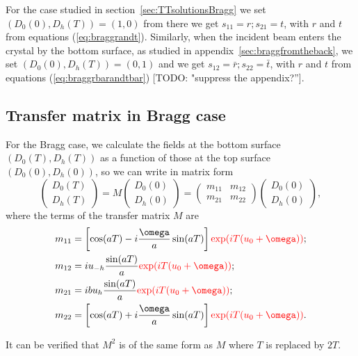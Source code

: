 \documentclass[preprint]{iucr}              %
\newcommand{\todo}[1]{{\color{red}[TODO: "#1'']}}
\newcommand{\inred}[1]{{\color{red}#1}}
\begin{document}
For the case studied in section~\ref{sec:TTsolutionsBragg} we set $(D_0(0),D_h(T))=(1,0)$ from there we get $s_{11}=r; s_{21}=t$, with $r$ and $t$ from equations (\ref{eq:braggrandt}). Similarly, when the incident beam enters the crystal by the bottom surface, as studied in appendix~\ref{sec:braggfromtheback}, we set $(D_0(0),D_h(T))=(0,1)$ and  we get $s_{12}=\bar{r}; s_{22}=\bar{t}$, with $r$ and $t$ from equations (\ref{eq:braggrbarandtbar}) \todo{suppress the appendix?}.


\subsection{Transfer matrix in Bragg case}
For the Bragg case, we calculate the fields at the bottom surface $(D_0(T),D_h(T))$ as a function of those at the top surface $(D_0(0),D_h(0))$, so we can write in matrix form
\begin{equation}
    \begin{pmatrix}
    D_0(T)\\
    D_h(T)
    \end{pmatrix}
    =
    M
        \begin{pmatrix}
    D_0(0) \\
    D_h(0)
    \end{pmatrix}
    =
    \begin{pmatrix}
    m_{11} & m_{12}\\
    m_{21} & m_{22}
    \end{pmatrix}
    \begin{pmatrix}
    D_0(0) \\
    D_h(0)
    \end{pmatrix},
\end{equation}
where the terms of the transfer matrix $M$ are 
\begin{subequations}\label{eq:scatteringMatrixBragg }
\begin{align}
m_{11} &= \left[ \cos(aT)-i\frac{\omega}{a}\sin(aT) \right] \inred{\exp(i T (u_0+\omega))};\\
m_{12} &= i u_{-h}\frac{\sin(aT)}{a} \inred{\exp(i T (u_0+\omega))};\\
m_{21} &= i b u_h \frac{\sin(aT)}{a} \inred{\exp(i T (u_0+\omega))};\\
m_{22} &= \left[ \cos(aT)+i \frac{\omega}{a}\sin(aT) \right] \inred{\exp(i T (u_0+\omega))}.
\end{align}
\end{subequations}

It can be verified that $M^2$ is of the same form as $M$ where $T$ is replaced by $2T$. 
\end{document}
